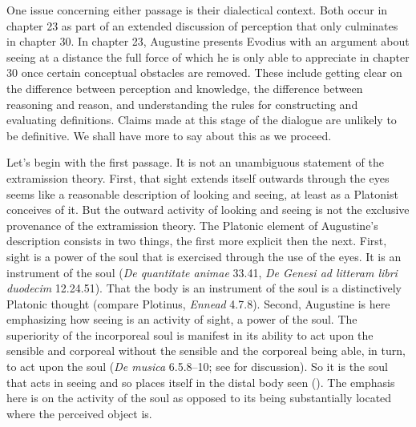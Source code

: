 \documentclass[12pt]{article}
\begin{document}
One issue concerning either passage is their dialectical context. Both occur in chapter 23 as part of an extended discussion of perception that only culminates in chapter 30. In chapter 23, Augustine presents Evodius with an argument about seeing at a distance the full force of which he is only able to appreciate in chapter 30 once certain conceptual obstacles are removed. These include getting clear on the difference between perception and knowledge, the difference between reasoning and reason, and understanding the rules for constructing and evaluating definitions. Claims made at this stage of the dialogue are unlikely to be definitive. We shall have more to say about this as we proceed.

Let's begin with the first passage. It is not an unambiguous statement of the extramission theory. First, that sight extends itself outwards through the eyes seems like a reasonable description of looking and seeing, at least as a Platonist conceives of it. But the outward activity of looking and seeing is not the exclusive provenance of the extramission theory. The Platonic element of Augustine's description consists in two things, the first more explicit then the next.  First, sight is a power of the soul that is exercised through the use of the eyes. It is an instrument of the soul (\emph{De quantitate animae} 33.41, \emph{De Genesi ad litteram libri duodecim} 12.24.51). That the body is an instrument of the soul is a distinctively Platonic thought (compare Plotinus, \emph{Ennead} 4.7.8). Second, Augustine is here emphasizing how seeing is an activity of sight, a power of the soul. The superiority of the incorporeal soul is manifest in its ability to act upon the sensible and corporeal without the sensible and the corporeal being able, in turn, to act upon the soul (\emph{De musica} 6.5.8--10; see \citealt{Silva:2014bh} for discussion). So it is the soul that acts in seeing and so places itself in the distal body seen (\citealt[205, n.55]{Colleran:1949ys}). The emphasis here is on the activity of the soul as opposed to its being substantially located where the perceived object is.
\end{document}
